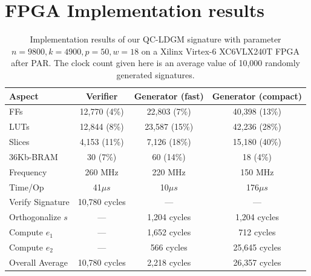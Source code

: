 \documentclass[10pt,journal,compsoc]{IEEEtran}
\begin{document}
\section{FPGA Implementation results}
\begin{table}[!t]\centering
	\caption{Implementation results of our QC-LDGM signature with parameter $n=9800,k=4900,p=50,w=18$ on a Xilinx Virtex-6 XC6VLX240T FPGA after PAR. The clock count given here is an average value of 10,000 randomly generated signatures.}
	\label{table:expresult}
	\begin{minipage}{.9\textwidth}\centering
		\begin{tabular}{lccc}
			\hline
			Aspect &Verifier & Generator (fast) & Generator (compact)\\
			\hline
			FFs & 12,770 (4\%) & 22,803 (7\%) & 40,398 (13\%)\\
			LUTs & 12,844 (8\%)& 23,587 (15\%)& 42,236 (28\%)\\
			Slices& 4,153 (11\%)& 7,126 (18\%) & 15,180 (40\%)\\
			36Kb-BRAM & 30 (7\%) & 60 (14\%) & 18 (4\%)\\
			\hline
			Frequency & 260 MHz & 220 MHz & 150 MHz\\
			Time/Op & 41$\mu s$ &10$\mu s$ & 176$\mu s$ \\
			\hline
			Verify Signature & 10,780 cycles & ---& ---\\
			Orthogonalize $s$& ---& 1,204 cycles & 1,204 cycles\\
			Compute $e_1$& ---& 1,652 cycles & 712 cycles\\
			Compute $e_2$& ---& 566 cycles & 25,645 cycles\\
			\hline
			Overall Average & 10,780 cycles & 2,218 cycles & 26,357 cycles\\
			\hline
		\end{tabular}
	\end{minipage}
\end{table}
\end{document}
